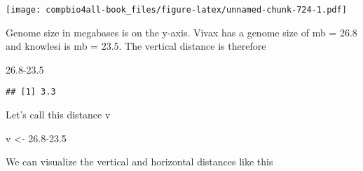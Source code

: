 \documentclass[
]{book}
\newenvironment{Shaded}{\begin{snugshade}}{\end{snugshade}}
\newcommand{\FloatTok}[1]{\textcolor[rgb]{0.00,0.00,0.81}{#1}}
\newcommand{\NormalTok}[1]{#1}
\newcommand{\OtherTok}[1]{\textcolor[rgb]{0.56,0.35,0.01}{#1}}
\begin{document}
\texttt{[image: compbio4all-book\_files/figure-latex/unnamed-chunk-724-1.pdf]}

Genome size in megabases is on the y-axis. Vivax has a genome size of mb = 26.8 and knowlesi is mb = 23.5. The vertical distance is therefore

\begin{Shaded}
\begin{Highlighting}[]
\FloatTok{26.8{-}23.5}
\end{Highlighting}
\end{Shaded}

\begin{verbatim}
## [1] 3.3
\end{verbatim}

Let's call this distance v

\begin{Shaded}
\begin{Highlighting}[]
\NormalTok{v }\OtherTok{\textless{}{-}} \FloatTok{26.8{-}23.5}
\end{Highlighting}
\end{Shaded}

We can visualize the vertical and horizontal distances like this
\end{document}
